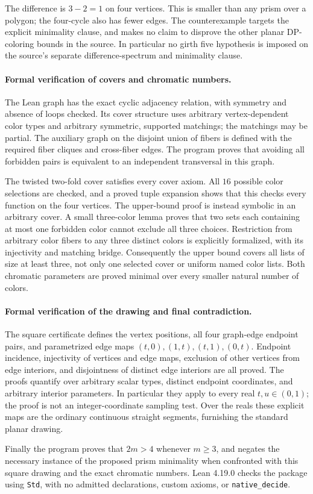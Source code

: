 \documentclass[11pt]{article}
\begin{document}
The difference is $3-2=1$ on four vertices. This is smaller than any prism
over a polygon; the four-cycle also has fewer edges. The counterexample
targets the explicit minimality clause, and makes no claim to disprove
the other planar DP-coloring bounds in the source. In particular no girth
five hypothesis is imposed on the source's separate difference-spectrum
and minimality clause.

\paragraph{Formal verification of covers and chromatic numbers.}
The Lean graph has the exact cyclic adjacency relation, with symmetry and
absence of loops checked. Its cover structure uses arbitrary vertex-dependent
color types and arbitrary symmetric, supported matchings; the matchings
may be partial. The auxiliary graph on the disjoint union of fibers is
defined with the required fiber cliques and cross-fiber edges. The program
proves that avoiding all forbidden pairs is equivalent to an independent
transversal in this graph.

The twisted two-fold cover satisfies every cover axiom. All $16$ possible
color selections are checked, and a proved tuple expansion shows that this
checks every function on the four vertices. The upper-bound proof is instead
symbolic in an arbitrary cover. A small three-color lemma proves that two
sets each containing at most one forbidden color cannot exclude all three
choices. Restriction from arbitrary color fibers to any three distinct
colors is explicitly formalized, with its injectivity and matching bridge.
Consequently the upper bound covers all lists of size at least three, not
only one selected cover or uniform named color lists. Both chromatic
parameters are proved minimal over every smaller natural number of colors.

\paragraph{Formal verification of the drawing and final contradiction.}
The square certificate defines the vertex positions, all four graph-edge
endpoint pairs, and parametrized edge maps
$(t,0),(1,t),(t,1),(0,t)$. Endpoint incidence, injectivity of vertices and
edge maps, exclusion of other vertices from edge interiors, and disjointness
of distinct edge interiors are all proved. The proofs quantify over
arbitrary scalar types, distinct endpoint coordinates, and arbitrary
interior parameters. In particular they apply to every real $t,u\in(0,1)$;
the proof is not an integer-coordinate sampling test. Over the reals these
explicit maps are the ordinary continuous straight segments, furnishing
the standard planar drawing.

Finally the program proves that $2m>4$ whenever $m\geq3$, and negates the
necessary instance of the proposed prism minimality when confronted with
this square drawing and the exact chromatic numbers. Lean 4.19.0 checks
the package using \texttt{Std}, with no admitted declarations, custom
axioms, or \texttt{native\_decide}.
\end{document}
